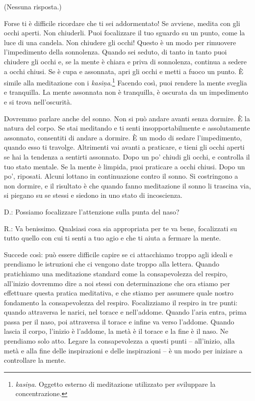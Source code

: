 (Nessuna risposta.)

Forse ti è difficile ricordare che ti sei addormentato! Se avviene,
medita con gli occhi aperti. Non chiuderli. Puoi focalizzare il tuo
sguardo su un punto, come la luce di una candela. Non chiudere gli
occhi! Questo è un modo per rimuovere l'impedimento della sonnolenza.
Quando sei seduto, di tanto in tanto puoi chiudere gli occhi e, se la
mente è chiara e priva di sonnolenza, continua a sedere a occhi chiusi.
Se è cupa e assonnata, apri gli occhi e metti a fuoco un punto. È simile
alla meditazione con i \emph{kasiṇa}.\footnote{\emph{kasiṇa}. Oggetto
  esterno di meditazione utilizzato per sviluppare la concentrazione.}
Facendo così, puoi rendere la mente sveglia e tranquilla. La mente
assonnata non è tranquilla, è oscurata da un impedimento e si trova
nell'oscurità.

Dovremmo parlare anche del sonno. Non si può andare avanti senza
dormire. È la natura del corpo. Se stai meditando e ti senti
insopportabilmente e assolutamente assonnato, consentiti di andare a
dormire. È un modo di sedare l'impedimento, quando esso ti travolge.
Altrimenti vai avanti a praticare, e tieni gli occhi aperti se hai la
tendenza a sentirti assonnato. Dopo un po' chiudi gli occhi, e controlla
il tuo stato mentale. Se la mente è limpida, puoi praticare a occhi
chiusi. Dopo un po', riposati. Alcuni lottano in continuazione contro il
sonno. Si costringono a non dormire, e il risultato è che quando fanno
meditazione il sonno li trascina via, si piegano su se stessi e siedono
in uno stato di incoscienza.

D.: Possiamo focalizzare l'attenzione sulla punta del naso?

R.: Va benissimo. Qualsiasi cosa sia appropriata per te va bene,
focalizzati su tutto quello con cui ti senti a tuo agio e che ti aiuta a
fermare la mente.

Succede così: può essere difficile capire se ci attacchiamo troppo agli
ideali e prendiamo le istruzioni che ci vengono date troppo alla
lettera. Quando pratichiamo una meditazione standard come la
consapevolezza del respiro, all'inizio dovremmo dire a noi stessi con
determinazione che ora stiamo per effettuare questa pratica meditativa,
e che stiamo per assumere quale nostro fondamento la consapevolezza del
respiro. Focalizziamo il respiro in tre punti: quando attraversa le
narici, nel torace e nell'addome. Quando l'aria entra, prima passa per
il naso, poi attraversa il torace e infine va verso l'addome. Quando
lascia il corpo, l'inizio è l'addome, la metà è il torace e la fine è il
naso. Ne prendiamo solo atto. Legare la consapevolezza a questi punti --
all'inizio, alla metà e alla fine delle inspirazioni e delle
inspirazioni -- è un modo per iniziare a controllare la mente.

